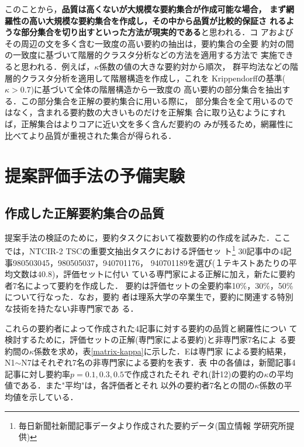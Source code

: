 \noindent
このことから，{\bf 品質は高くないが大規模な要約集合が作成可能な場合，
まず網羅性の高い大規模な要約集合を作成し，その中から品質が比較的保証さ
れるような部分集合を切り出すといった方法が現実的である}と思われる．コ
アおよびその周辺の文を多く含む一致度の高い要約の抽出は，要約集合の全要
約対の間の一致度に基づいて階層的クラスタ分析などの方法を適用する方法で
実施できると思われる．例えば，$\kappa$係数の値の大きな要約対から順次，
群平均法などの階層的クラスタ分析を適用して階層構造を作成し，これを
Krippendorffの基準($\kappa > 0.7$)に基づいて全体の階層構造から一致度の
高い要約の部分集合を抽出する．この部分集合を正解の要約集合に用いる際に，
部分集合を全て用いるのではなく，含まれる要約数の大きいものだけを正解集
合に取り込むようにすれば，正解集合はよりコアに近い文を多く含んだ要約の
みが残るため，網羅性に比べてより品質が重視された集合が得られる．


\section{提案評価手法の予備実験}

\subsection{作成した正解要約集合の品質}

提案手法の検証のために，要約タスクにおいて複数要約の作成を試みた．ここ
では，NTCIR-2 TSCの重要文抽出タスク\cite{T.Fukusima.01}における評価セッ
ト\footnote {毎日新聞社新聞記事データより作成された要約データ(国立情報
学研究所提供)} 30記事中の4記事980503045，980505037，940701176，
940701189を選び(１テキストあたりの平均文数は$40.8$)，評価セットに付い
ている専門家による正解に加え，新たに要約者7名によって要約を作成した．
要約は評価セットの全要約率10\%，30\%，50\%について行なった．なお，要約
者は理系大学の卒業生で，要約に関連する特別な技術を持たない非専門家であ
る．

これらの要約者によって作成された4記事に対する要約の品質と網羅性につい
て検討するために，評価セットの正解(専門家による要約)と非専門家7名によ
る要約間の$\kappa$係数を求め，表\ref{matrix-kappa}に示した．Eは専門家
による要約結果，N1$\sim$N7はそれぞれ7名の非専門家による要約を表す．表
中の各値は，新聞記事4記事に対し要約率$p=0.1, 0.3, 0.5$で作成されたそれ
ぞれ(計12)の要約の$\kappa$の平均値である．また"平均"は，各評価者とそれ
以外の要約者7名との間の$\kappa$係数の平均値を示している．

